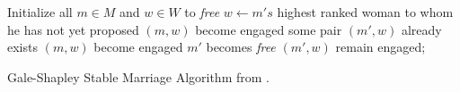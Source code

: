 \begin{algorithm}[t]

Initialize all $m \in M$ and $w \in W$ to \textit{free} \;
 {
	$w \leftarrow m's$ highest ranked woman to whom he has not yet proposed \;
	{ 
		$(m,w)$ become engaged \;
	}
	{
		some pair $(m',w)$ already exists \;
		{
			$(m,w)$ become engaged \;
			$m'$ becomes \textit{free} \;
		}
		{
			 $(m',w)$ remain engaged;
		}
	}
}
\caption{Gale-Shapley Stable Marriage Algorithm from \cite{Gusfield1989SMP}.}
\label{alg:stable-matching}
\end{algorithm}


